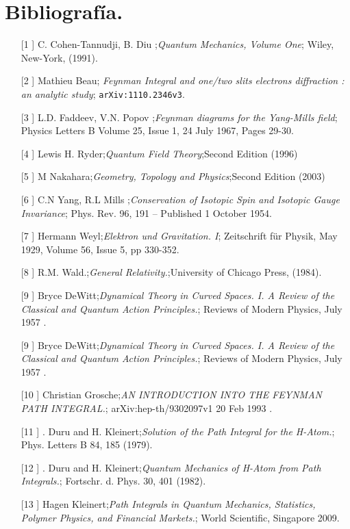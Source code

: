 \chapter{Bibliografía.}
\begin{itemize}
\item[[1]] C. Cohen-Tannudji, B. Diu ;\textit{Quantum Mechanics, Volume One}; Wiley, New-York, (1991).
\item[[2]] Mathieu Beau; \textit{Feynman Integral and one/two slits electrons diffraction : an analytic study}; \texttt{arXiv:1110.2346v3}.
\item[[3]]  L.D. Faddeev,  V.N. Popov ;\textit{Feynman diagrams for the Yang-Mills field}; Physics Letters B Volume 25, Issue 1, 24 July 1967, Pages 29-30.
\item[[4]] Lewis H. Ryder;\textit{Quantum Field Theory};Second Edition (1996) 
\item[[5]] M Nakahara;\textit{Geometry, Topology and Physics};Second Edition (2003) 
\item[[6]]  C.N Yang,  R.L Mills ;\textit{Conservation of Isotopic Spin and Isotopic Gauge Invariance}; Phys. Rev. 96, 191 – Published 1 October 1954.
\item[[7]]  Hermann Weyl;\textit{Elektron und Gravitation. I}; Zeitschrift für Physik, May 1929, Volume 56, Issue 5, pp 330-352.
\item[[8]] R.M. Wald.;\textit{General Relativity.};University of Chicago Press, (1984). 
\item[[9]]  Bryce DeWitt;\textit{Dynamical Theory in Curved Spaces. I. A Review of the Classical and Quantum Action Principles.}; Reviews of Modern Physics, July 1957 .
\item[[9]]  Bryce DeWitt;\textit{Dynamical Theory in Curved Spaces. I. A Review of the Classical and Quantum Action Principles.}; Reviews of Modern Physics, July 1957 .
\item[[10]]  Christian Grosche;\textit{AN INTRODUCTION INTO
THE FEYNMAN PATH INTEGRAL.}; arXiv:hep-th/9302097v1 20 Feb 1993 .
\item[[11]]  . Duru and H. Kleinert;\textit{Solution of the Path Integral for the H-Atom.}; Phys. Letters B 84, 185 (1979).
\item[[12]]  . Duru and H. Kleinert;\textit{Quantum Mechanics of H-Atom from Path Integrals.};  Fortschr. d. Phys. 30, 401 (1982).
\item[[13]]  Hagen Kleinert;\textit{Path Integrals in Quantum Mechanics, Statistics, Polymer Physics, and Financial Markets.};  World Scientific, Singapore 2009.

\end{itemize}
